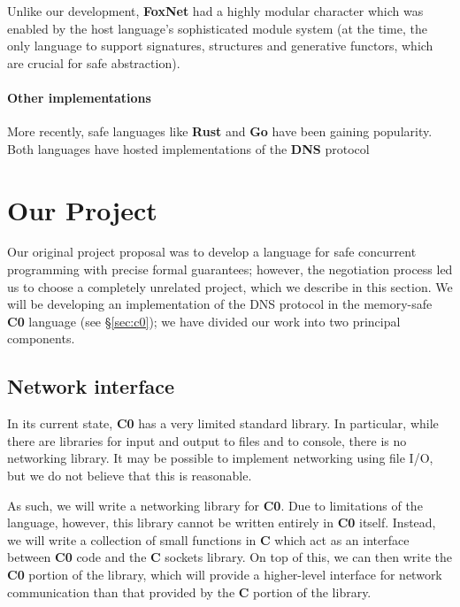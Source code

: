 \documentclass{article}
\newcommand\Kwd[1]{{\sffamily\bfseries{#1}}}
\begin{document}
Unlike our development, \Kwd{FoxNet} had a highly modular character
which was enabled by the host language's sophisticated module system
(at the time, the only language to support signatures, structures and
generative functors, which are crucial for safe abstraction).


\paragraph{Other implementations} More recently, safe languages like
\Kwd{Rust} and \Kwd{Go} have been gaining popularity. Both languages
have hosted implementations of the \Kwd{DNS}
protocol~\cite{github:trust-dns,github:miekg-dns}


\section{Our Project}\label{sec:our-project}

Our original project proposal was to develop a language for safe
concurrent programming with precise formal guarantees; however, the
negotiation process led us to choose a completely unrelated project,
which we describe in this section. We will be developing an
implementation of the DNS protocol in the memory-safe \Kwd{C0}
language (see \S\ref{sec:c0}); we have divided our work into two
principal components.

\subsection{Network interface}\label{sec:network-interface}

In its current state, \Kwd{C0} has a very limited standard library. In particular, while there are libraries for input and output to files and to console, there is no networking library. It may be possible to implement networking using file I/O, but we do not believe that this is reasonable.

As such, we will write a networking library for \Kwd{C0}. Due to limitations of the language, however, this library cannot be written entirely in \Kwd{C0} itself. Instead, we will write a collection of small functions in \Kwd{C} which act as an interface between \Kwd{C0} code and the \Kwd{C} sockets library. On top of this, we can then write the \Kwd{C0} portion of the library, which will provide a higher-level interface for network communication than that provided by the \Kwd{C} portion of the library.
\end{document}
